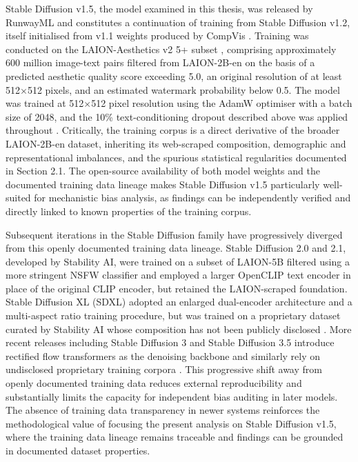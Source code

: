 Stable Diffusion v1.5, the model examined in this thesis, was released 
by RunwayML and constitutes a continuation of training from Stable 
Diffusion v1.2, itself initialised from v1.1 weights produced by CompVis 
\cite{StableDiffusion_2022_SD15modelcard}. Training was conducted on the LAION-Aesthetics v2 
5+ subset \cite{Schuhmann_2022_LaionAesthetics}, comprising approximately 600 million 
image-text pairs filtered from LAION-2B-en on the basis of a predicted 
aesthetic quality score exceeding 5.0, an original resolution of at 
least 512$\times$512 pixels, and an estimated watermark probability 
below 0.5. The model was trained at 512$\times$512 pixel resolution 
using the AdamW optimiser with a batch size of 2048, and the 10\% 
text-conditioning dropout described above was applied throughout 
\cite{StableDiffusion_2022_SD15modelcard}. Critically, the training corpus is a direct 
derivative of the broader LAION-2B-en dataset, inheriting its 
web-scraped composition, demographic and representational imbalances, 
and the spurious statistical regularities documented in Section 2.1. 
The open-source availability of both model weights and the documented 
training data lineage makes Stable Diffusion v1.5 particularly 
well-suited for mechanistic bias analysis, as findings can be 
independently verified and directly linked to known properties of 
the training corpus.

Subsequent iterations in the Stable Diffusion family have progressively 
diverged from this openly documented training data lineage. Stable 
Diffusion 2.0 and 2.1, developed by Stability AI, were trained on a 
subset of LAION-5B filtered using a more stringent NSFW classifier and 
employed a larger OpenCLIP text encoder \cite{Cherti_2023_OpenCLIP} 
in place of the original CLIP encoder, but retained the LAION-scraped 
foundation. Stable Diffusion XL (SDXL) adopted an enlarged dual-encoder 
architecture and a multi-aspect ratio training procedure, but was trained 
on a proprietary dataset curated by Stability AI whose composition has 
not been publicly disclosed \cite{Podell_2023_SDXL}. More recent releases 
including Stable Diffusion 3 and Stable Diffusion 3.5 introduce rectified 
flow transformers as the denoising backbone and similarly rely on 
undisclosed proprietary training corpora \cite{Esser_2024_SD3}. This 
progressive shift away from openly documented training data reduces 
external reproducibility and substantially limits the capacity for 
independent bias auditing in later models. The absence of training data 
transparency in newer systems reinforces the methodological value of 
focusing the present analysis on Stable Diffusion v1.5, where the 
training data lineage remains traceable and findings can be grounded 
in documented dataset properties.

